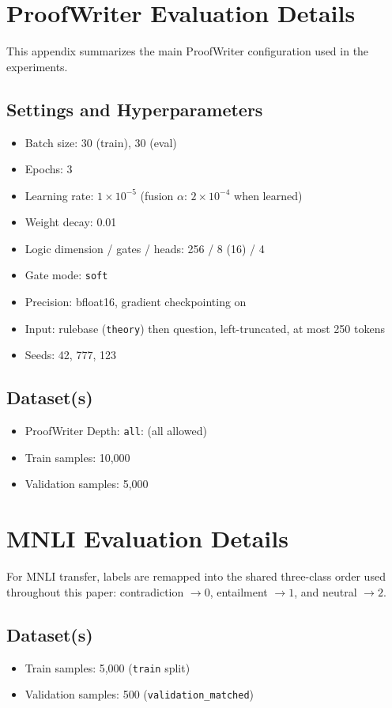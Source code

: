 \documentclass[10pt,twocolumn,letterpaper]{article}
\begin{document}
\section{ProofWriter Evaluation Details}
This appendix summarizes the main ProofWriter configuration used in the
experiments.

\subsection{Settings and Hyperparameters}
\begin{itemize}
\item Batch size: 30 (train), 30 (eval)
\item Epochs: 3
\item Learning rate: $1\times10^{-5}$ (fusion $\alpha$: $2\times10^{-4}$ when learned)
\item Weight decay: 0.01
\item Logic dimension / gates / heads: 256 / 8 (16) / 4
\item Gate mode: \texttt{soft}
\item Precision: bfloat16, gradient checkpointing on
\item Input: rulebase (\texttt{theory}) then question, left-truncated, at most 250 tokens
\item Seeds: 42, 777, 123
\end{itemize}

\subsection{Dataset(s)}
\begin{itemize}
\item ProofWriter Depth: \texttt{all}: (all allowed)
\item Train samples: 10,000
\item Validation samples: 5,000
\end{itemize}

\section{MNLI Evaluation Details}
For MNLI transfer, labels are remapped into the shared
three-class order used throughout this paper:
contradiction $\rightarrow 0$, entailment $\rightarrow 1$, and
neutral $\rightarrow 2$.

\subsection{Dataset(s)}
\begin{itemize}
\item Train samples: 5,000 (\texttt{train} split)
\item Validation samples: 500 (\texttt{validation\_matched})
\end{itemize}
\end{document}
